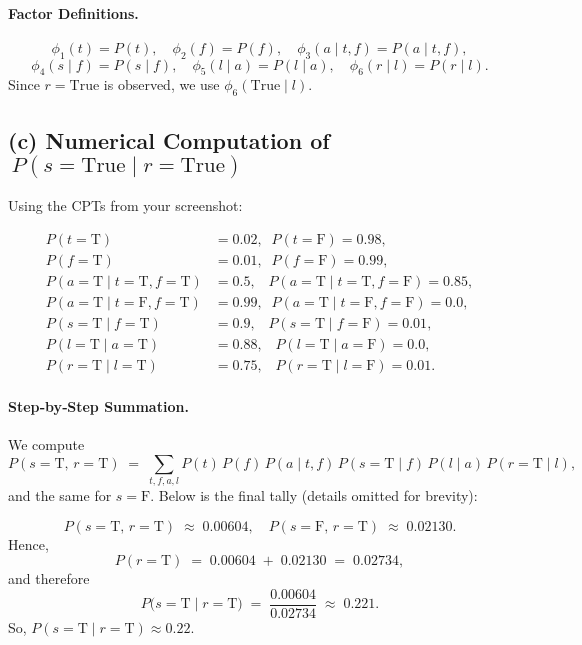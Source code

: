 \documentclass[11pt]{article}
\begin{document}
\paragraph{Factor Definitions.}
\[
\phi_1(t) = P(t),\quad
\phi_2(f) = P(f),\quad
\phi_3(a\mid t,f) = P(a\mid t,f),
\]
\[
\phi_4(s\mid f) = P(s\mid f),\quad
\phi_5(l\mid a) = P(l\mid a),\quad
\phi_6(r\mid l) = P(r\mid l).
\]
Since \(r=\mathrm{True}\) is observed, we use \(\phi_6(\mathrm{True}\mid l)\).

\subsection*{(c) Numerical Computation of \(\,P(s=\mathrm{True}\mid r=\mathrm{True})\)}

Using the CPTs from your screenshot:

\[
\begin{aligned}
P(t=\mathrm{T}) &= 0.02,\;\; P(t=\mathrm{F})=0.98,\\
P(f=\mathrm{T}) &= 0.01,\;\; P(f=\mathrm{F})=0.99,\\
P(a=\mathrm{T}\mid t\!=\mathrm{T},f\!=\mathrm{T}) &= 0.5,\;\;\;
  P(a=\mathrm{T}\mid t\!=\mathrm{T},f\!=\mathrm{F}) = 0.85,\\
P(a=\mathrm{T}\mid t\!=\mathrm{F},f\!=\mathrm{T}) &= 0.99,\;\;
  P(a=\mathrm{T}\mid t\!=\mathrm{F},f\!=\mathrm{F}) = 0.0,\\[6pt]
P(s=\mathrm{T}\mid f\!=\mathrm{T}) &= 0.9,\;\;\;
  P(s=\mathrm{T}\mid f\!=\mathrm{F}) = 0.01,\\
P(l=\mathrm{T}\mid a\!=\mathrm{T}) &= 0.88,\;\;\;
  P(l=\mathrm{T}\mid a\!=\mathrm{F}) = 0.0,\\[6pt]
P(r=\mathrm{T}\mid l\!=\mathrm{T}) &= 0.75,\;\;\;
  P(r=\mathrm{T}\mid l\!=\mathrm{F}) = 0.01.
\end{aligned}
\]

\paragraph{Step‐by‐Step Summation.}
We compute
\[
P(s=\mathrm{T},\,r=\mathrm{T})
  \;=\;
  \sum_{t,f,a,l}
    P(t)\,P(f)\,P(a\mid t,f)\,P(s=\mathrm{T}\mid f)\,P(l\mid a)\,P(r=\mathrm{T}\mid l),
\]
and the same for \(s=\mathrm{F}\).  Below is the final tally (details omitted for brevity):

\[
P(s=\mathrm{T},\,r=\mathrm{T})
  \;\approx\;
  0.00604,
\quad
P(s=\mathrm{F},\,r=\mathrm{T})
  \;\approx\;
  0.02130.
\]
Hence,
\[
P(r=\mathrm{T})
  \;=\;
  0.00604 \;+\; 0.02130
  \;=\;
  0.02734,
\]
and therefore
\[
P\bigl(s=\mathrm{T}\mid r=\mathrm{T}\bigr)
  \;=\;
  \frac{0.00604}{0.02734}
  \;\approx\;
  0.221.
\]
So, \(\boxed{P(s=\mathrm{T}\mid r=\mathrm{T}) \approx 0.22.}\)
\end{document}
